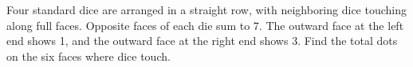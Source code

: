 Four standard dice are arranged in a straight row, with neighboring dice touching along full faces. Opposite faces of each die sum to 7. The outward face at the left end shows 1, and the outward face at the right end shows 3. Find the total dots on the six faces where dice touch.
